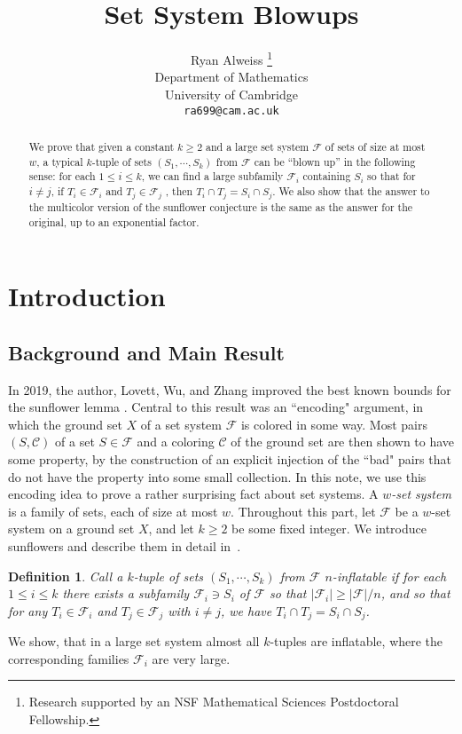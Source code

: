 \documentclass[12pt]{article}
\title{Set System Blowups}
\author{
Ryan Alweiss \thanks{Research supported by an NSF Mathematical Sciences Postdoctoral Fellowship.} \\
Department of Mathematics\\
University of Cambridge\\
\texttt{ra699@cam.ac.uk}
}
\newtheorem{definition}[theorem]{Definition}
\newcommand{\F}{\mathcal{F}}
\newcommand{\C}{\mathcal{C}}
\begin{document}
\maketitle

\begin{abstract}
	We prove that given a constant $k \ge 2$ and a large set system $\F$ of sets of size at most $w$, a typical $k$-tuple of sets $(S_1, \cdots, S_k)$ from $\F$ can be “blown up” in the following sense: for each $1 \le i \le k$, we can find a large subfamily $\F_i$ containing $S_i$ so that for $i \neq j$, if $T_i \in \F_i$ and $T_j \in \F_j$ , then $T_i \cap T_j=S_i \cap S_j$.  We also show that the answer to the multicolor version of the sunflower conjecture is the same as the answer for the original, up to an exponential factor.
	
	\iffalse This greatly improves the bounds in an old result of Furedi. \fi
\end{abstract}

\section{Introduction}
\label{s1}
\subsection{Background and Main Result}
In 2019, the author, Lovett, Wu, and Zhang improved the best known bounds for the sunflower lemma \cite{alwz}.  Central to this result was an ``encoding" argument, in which the ground set $X$ of a set system $\F$ is colored in some way. Most pairs $(S,\C)$ of a set $S \in \F$ and a coloring $\C$ of the ground set are then shown to have some property, by the construction of an explicit injection of the ``bad" pairs that do not have the property into some small collection.
In this note, we use this encoding idea to prove a rather surprising fact about set systems. A \emph{$w$-set system} is a family of sets, each of size at most $w$. Throughout this part, let $\F$ be a $w$-set system on a ground set $X$, and let $k \ge 2$ be some fixed integer. We introduce sunflowers and describe them in detail in~. \begin{definition}
Call a $k$-tuple of sets $(S_1, \cdots, S_k)$ from $\F$ $n$-\emph{inflatable} if for each $1 \le i \le k$ there exists a subfamily $\F_i \ni S_i$ of $\F$ so that $|\F_i| \ge |\F|/n$, and so that for any $T_i \in \F_i$ and $T_j \in \F_j$ with $i \neq j$, we have $T_i \cap T_j = S_i \cap S_j$.  
\end{definition}
We show, that in a large set system almost all $k$-tuples are inflatable, where the corresponding families $\F_i$ are very large.
\end{document}
